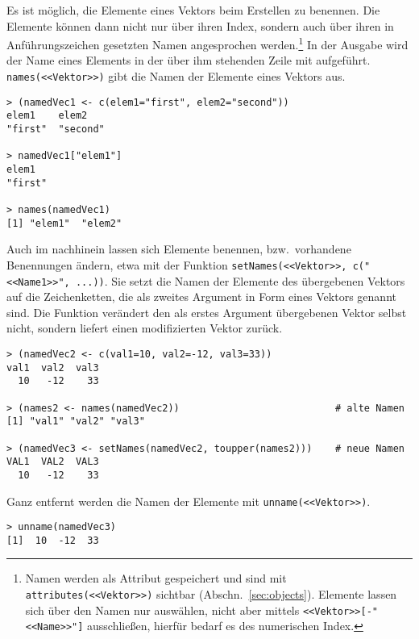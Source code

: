Es ist möglich, die Elemente eines Vektors beim Erstellen zu benennen. Die Elemente können dann nicht nur über ihren Index, sondern auch über ihren in Anführungszeichen gesetzten Namen angesprochen werden.\footnote{Namen werden als Attribut gespeichert und sind mit \lstinline!attributes(<<Vektor>>)! sichtbar (Abschn.\ \ref{sec:objects}). Elemente lassen sich über den Namen nur auswählen, nicht aber mittels \lstinline!<<Vektor>>[-"<<Name>>"]! ausschließen, hierfür bedarf es des numerischen Index.} In der Ausgabe wird der Name eines Elements in der über ihm stehenden Zeile mit aufgeführt.  \lstinline!names(<<Vektor>>)! gibt die Namen der Elemente eines Vektors aus.
\begin{lstlisting}
> (namedVec1 <- c(elem1="first", elem2="second"))
elem1    elem2
"first"  "second"

> namedVec1["elem1"]
elem1
"first"

> names(namedVec1)
[1] "elem1"  "elem2"
\end{lstlisting}

Auch im nachhinein lassen sich Elemente benennen, bzw.\ vorhandene Benennungen ändern, etwa mit der Funktion \lstinline!setNames(<<Vektor>>, c("<<Name1>>", ...))!. Sie setzt die Namen der Elemente des übergebenen Vektors auf die Zeichenketten, die als zweites Argument in Form eines Vektors genannt sind. Die Funktion verändert den als erstes Argument übergebenen Vektor selbst nicht, sondern liefert einen modifizierten Vektor zurück.
\begin{lstlisting}
> (namedVec2 <- c(val1=10, val2=-12, val3=33))
val1  val2  val3
  10   -12    33

> (names2 <- names(namedVec2))                           # alte Namen
[1] "val1" "val2" "val3"

> (namedVec3 <- setNames(namedVec2, toupper(names2)))    # neue Namen
VAL1  VAL2  VAL3
  10   -12    33
\end{lstlisting}

Ganz entfernt werden die Namen der Elemente mit  \lstinline!unname(<<Vektor>>)!.
\begin{lstlisting}
> unname(namedVec3)
[1]  10  -12  33
\end{lstlisting}

